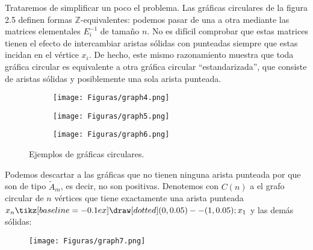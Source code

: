 Trataremos de simplificar un poco el problema. Las gráficas circulares de la figura 2.5 definen formas $\mathbb{Z}$-equivalentes: podemos pasar de una a otra mediante las matrices elementales $E_{i}^{-1}$ de tamaño $n$. No es difícil comprobar que estas matrices tienen el efecto de intercambiar aristas sólidas con punteadas siempre que estas incidan en el vértice $x_{i}$. De hecho, este mismo razonamiento muestra que toda gráfica circular es equivalente a otra gráfica circular “estandarizada”, que consiste de aristas sólidas y posiblemente una sola arista punteada.\\

\begin{figure}[h]
    \begin{subfigure}[b]{0.3\textwidth}
      \begin{minipage}{7cm}
	\centering%
	    \texttt{[image: Figuras/graph4.png]}
	 \end{minipage}
	\caption{}
     \end{subfigure}
     \begin{subfigure}[b]{0.3\textwidth}
        \begin{minipage}{7cm}
       	 \centering%
	    \texttt{[image: Figuras/graph5.png]}
        \end{minipage}
        \caption{}
     \end{subfigure}
     \begin{subfigure}[b]{0.3\textwidth}
        \begin{minipage}{7cm}
       	 \centering%
	    \texttt{[image: Figuras/graph6.png]}
        \end{minipage}
        \caption{}
     \end{subfigure}
     \caption{Ejemplos de gráficas circulares.}
    \label{figura:2.5}
\end{figure}

Podemos descartar a las gráficas que no tienen ninguna arista punteada por que son de tipo $\tilde{A}_{m}$, es decir, no son positivas. Denotemos con $C\left(n\right)$ a el grafo circular de $n$ vértices que tiene exactamente una arista punteada $x_{n} \tikz[baseline=-0.1ex]\draw [dotted] (0,0.05) -- (1,0.05); x_{1}$ y las demás sólidas:

\begin{figure}[h]
   \centering%
   \texttt{[image: Figuras/graph7.png]}
\end{figure}

